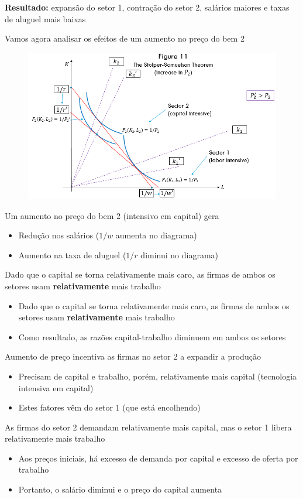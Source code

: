 \documentclass[a4paper,12pt]{article}[abntex2]
\begin{document}
\textbf{Resultado:} expansão do setor 1, contração do setor 2, salários maiores e taxas de aluguel mais baixas

Vamos agora analisar os efeitos de um aumento no preço do bem 2
\begin{figure}[H]
    \centering
    \includegraphics[width=0.7\linewidth]{Imagens/a10i11.png}
\end{figure}

Um aumento no preço do bem 2 (intensivo em capital) gera\begin{itemize}
    \item Redução nos salários (\(1/w\) aumenta no diagrama)
    \item Aumento na taxa de aluguel (\(1/r\) diminui no diagrama)
\end{itemize}

Dado que o capital se torna relativamente mais caro, as firmas de ambos os setores usam \textbf{relativamente} mais trabalho\begin{itemize}
    \item Dado que o capital se torna relativamente mais caro, as firmas de ambos os setores usam \textbf{relativamente} mais trabalho
    \item Como resultado, as razões capital-trabalho diminuem em ambos os setores
\end{itemize}

Aumento de preço incentiva as firmas no setor 2 a expandir a produção\begin{itemize}
    \item Precisam de capital e trabalho, porém, relativamente mais capital (tecnologia intensiva em capital)
    \item Estes fatores vêm do setor 1 (que está encolhendo)
\end{itemize}

As firmas do setor 2 demandam relativamente mais capital, mas o setor 1 libera relativamente mais trabalho\begin{itemize}
    \item Aos preços iniciais, há excesso de demanda por capital e excesso de oferta por trabalho
    \item Portanto, o salário diminui e o preço do capital aumenta
\end{itemize}
\end{document}

